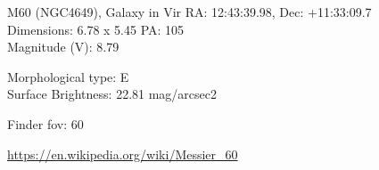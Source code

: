 \begin{block}{M60 (NGC4649), Galaxy in Vir}
    RA: 12:43:39.98, Dec: +11:33:09.7 \\ 
    Dimensions: 6.78 x 5.45 PA: 105 \\ 
    Magnitude (V): 8.79

    Morphological type: E \\ 
    Surface Brightness: 22.81 mag/arcsec2 


    Finder fov: 60 

    \url{https://en.wikipedia.org/wiki/Messier_60} 
\end{block}